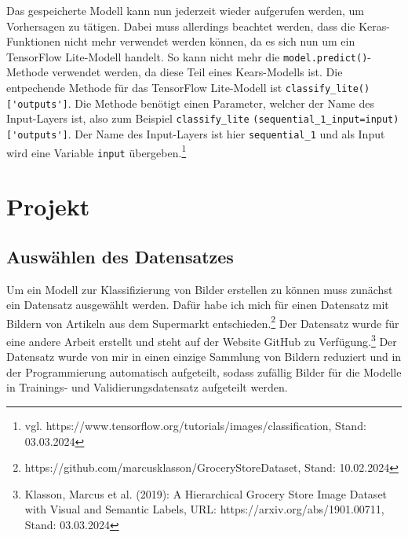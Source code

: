 \documentclass[11pt,oneside]{report}
\begin{document}
Das gespeicherte Modell kann nun jederzeit wieder aufgerufen werden, um Vorhersagen zu tätigen. Dabei muss allerdings beachtet werden, dass die Keras-Funktionen nicht mehr verwendet werden können, da es sich nun um ein TensorFlow Lite-Modell handelt. So kann nicht mehr die \verb+model.predict()+-Methode verwendet werden, da diese Teil eines Kears-Modells ist. Die entpechende Methode für das TensorFlow Lite-Modell ist \verb+classify_lite()['outputs']+. Die Methode benötigt einen Parameter, welcher der Name des Input-Layers ist, also zum Beispiel \verb+classify_lite+ \verb+(sequential_1_input=input)['outputs']+. Der Name des Input-Layers ist hier \verb+sequential_1+ und als Input wird eine Variable \verb+input+ übergeben.\footnote{vgl. https://www.tensorflow.org/tutorials/images/classification, Stand: 03.03.2024}


\chapter{Projekt}

\section{Auswählen des Datensatzes}
Um ein Modell zur Klassifizierung von Bilder erstellen zu können muss zunächst ein Datensatz ausgewählt werden. Dafür habe ich mich für einen Datensatz mit Bildern von Artikeln aus dem Supermarkt entschieden.\footnote{https://github.com/marcusklasson/GroceryStoreDataset, Stand: 10.02.2024} Der Datensatz wurde für eine andere Arbeit erstellt und steht auf der Website GitHub zu Verfügung.\footnote{Klasson, Marcus et al. (2019): A Hierarchical Grocery Store Image Dataset with Visual and Semantic Labels, URL: https://arxiv.org/abs/1901.00711, Stand: 03.03.2024} Der Datensatz wurde von mir in einen einzige Sammlung von Bildern reduziert und in der Programmierung automatisch aufgeteilt, sodass zufällig Bilder für die Modelle in Trainings- und Validierungsdatensatz aufgeteilt werden.
\end{document}
